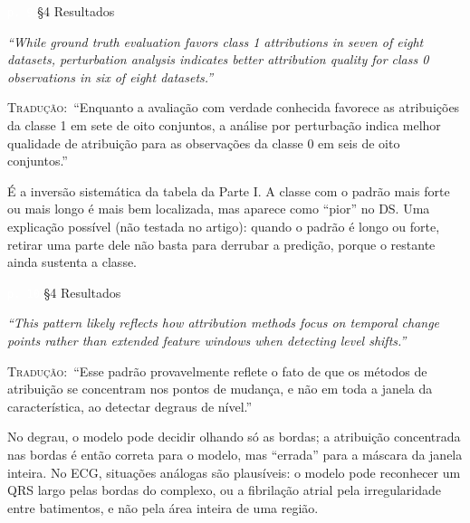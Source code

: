 \documentclass[11pt,a4paper]{article}
\newcommand{\pagechip}[1]{{\setlength{\fboxsep}{1.5pt}\colorbox{cAcc}{\textcolor{white}{\scriptsize\texttt{#1}}}}}
\newenvironment{origquote}{\par\itshape\small}{\par}
\newenvironment{tradquote}{\par\small\textsc{Tradução:}\ }{\par}
\newcommand{\explab}[1]{\par\smallskip{\small\color{cAcc}\textbf{\MakeUppercase{#1}}}\par}
\begin{document}
\begin{citacard}{\pagechip{p. 9} §4 Resultados}
\begin{origquote}“While ground truth evaluation favors class 1 attributions in seven of eight datasets, perturbation analysis indicates better attribution quality for class 0 observations in six of eight datasets.”\end{origquote}
\begin{tradquote}“Enquanto a avaliação com verdade conhecida favorece as atribuições da classe 1 em sete de oito conjuntos, a análise por perturbação indica melhor qualidade de atribuição para as observações da classe 0 em seis de oito conjuntos.”\end{tradquote}
\explab{Explicação}
É a inversão sistemática da tabela da Parte I. A classe com o padrão mais forte ou mais longo é mais bem localizada, mas aparece como “pior” no DS. Uma explicação possível (não testada no artigo): quando o padrão é longo ou forte, retirar uma parte dele não basta para derrubar a predição, porque o restante ainda sustenta a classe.
\end{citacard}

\begin{citacard}{\pagechip{p. 10} §4 Resultados}
\begin{origquote}“This pattern likely reflects how attribution methods focus on temporal change points rather than extended feature windows when detecting level shifts.”\end{origquote}
\begin{tradquote}“Esse padrão provavelmente reflete o fato de que os métodos de atribuição se concentram nos pontos de mudança, e não em toda a janela da característica, ao detectar degraus de nível.”\end{tradquote}
\explab{Explicação}
No degrau, o modelo pode decidir olhando só as bordas; a atribuição concentrada nas bordas é então correta para o modelo, mas “errada” para a máscara da janela inteira. No ECG, situações análogas são plausíveis: o modelo pode reconhecer um QRS largo pelas bordas do complexo, ou a fibrilação atrial pela irregularidade entre batimentos, e não pela área inteira de uma região.
\end{citacard}
\end{document}
